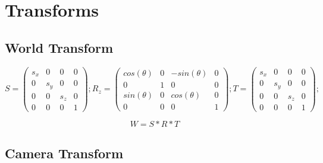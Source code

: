 \begin{codelisting}
	
\end{codelisting}

\begin{codesection}
	
\end{codesection}

\pagebreak
\section{Transforms}
\label{sec:transf}
\setcounter{lstlisting}{0}

\subsection{World Transform}

\[
S = \begin{pmatrix}
s_x & 0 & 0 & 0\\
0 & s_y & 0 & 0\\
0 & 0 & s_z & 0\\
0 & 0 & 0 & 1
\end{pmatrix};
R_z = \begin{pmatrix}
cos(\theta) & 0 & -sin(\theta) & 0\\
0 & 1 & 0 & 0\\
sin(\theta) & 0 & cos(\theta) & 0\\
0 & 0 & 0 & 1
\end{pmatrix};
T = \begin{pmatrix}
s_x & 0 & 0 & 0\\
0 & s_y & 0 & 0\\
0 & 0 & s_z & 0\\
0 & 0 & 0 & 1
\end{pmatrix};
\]

\[W = S * R * T\]

\begin{codesection}
	
\end{codesection}

\pagebreak

\subsection{Camera Transform}

